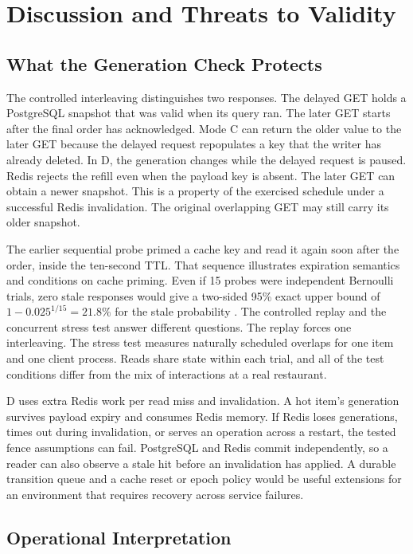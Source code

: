 \section{Discussion and Threats to Validity}

\subsection{What the Generation Check Protects}

The controlled interleaving distinguishes two responses. The delayed GET holds a PostgreSQL snapshot that was valid when its query ran. The later GET starts after the final order has acknowledged. Mode C can return the older value to the later GET because the delayed request repopulates a key that the writer has already deleted. In D, the generation changes while the delayed request is paused. Redis rejects the refill even when the payload key is absent. The later GET can obtain a newer snapshot. This is a property of the exercised schedule under a successful Redis invalidation. The original overlapping GET may still carry its older snapshot.

The earlier sequential probe primed a cache key and read it again soon after the order, inside the ten-second TTL. That sequence illustrates expiration semantics and conditions on cache priming. Even if 15 probes were independent Bernoulli trials, zero stale responses would give a two-sided 95\% exact upper bound of \(1-0.025^{1/15}=21.8\%\) for the stale probability \cite{clopper1934}. The controlled replay and the concurrent stress test answer different questions. The replay forces one interleaving. The stress test measures naturally scheduled overlaps for one item and one client process. Reads share state within each trial, and all of the test conditions differ from the mix of interactions at a real restaurant.

D uses extra Redis work per read miss and invalidation. A hot item's generation survives payload expiry and consumes Redis memory. If Redis loses generations, times out during invalidation, or serves an operation across a restart, the tested fence assumptions can fail. PostgreSQL and Redis commit independently, so a reader can also observe a stale hit before an invalidation has applied. A durable transition queue and a cache reset or epoch policy would be useful extensions for an environment that requires recovery across service failures.

\subsection{Operational Interpretation}

